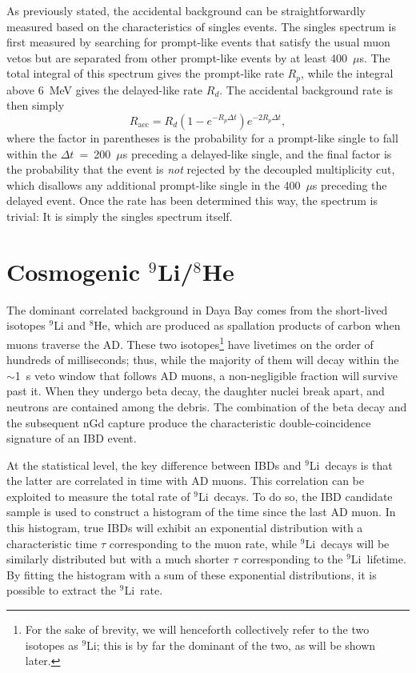 \documentclass[../thesis.tex]{subfiles}
\begin{document}
As previously stated, the accidental background can be straightforwardly measured based on the characteristics of singles events. The singles spectrum is first measured by searching for prompt-like events that satisfy the usual muon vetos but are separated from other prompt-like events by at least 400~$\mu$s. The total integral of this spectrum gives the prompt-like rate $R_p$, while the integral above 6~MeV gives the delayed-like rate $R_d$. The accidental background rate is then simply
\[ R_\mathrm{acc} = R_d(1 - e^{-R_p\Delta t})e^{-2R_p\Delta t}, \] where the factor in parentheses is the probability for a prompt-like single to fall within the $\Delta t$~=~200~$\mu$s preceding a delayed-like single, and the final factor is the probability that the event is \emph{not} rejected by the decoupled multiplicity cut, which disallows any additional prompt-like single in the 400~$\mu$s preceding the delayed event. Once the rate has been determined this way, the spectrum is trivial: It is simply the singles spectrum itself.

\begin{comment}
  Mention IHEP's cross-check, and the additional uncertainty stemming from the difference between it and the nominal result?
\end{comment}

\section{Cosmogenic $^9$Li/$^8$He}
\label{sec:bkgCosmo}

\newcommand\linine{$^9$Li}

The dominant correlated background in Daya Bay comes from the short-lived isotopes $^9$Li and $^8$He, which are produced as spallation products of carbon when muons traverse the AD. These two isotopes\footnote{For the sake of brevity, we will henceforth collectively refer to the two isotopes as \linine; this is by far the dominant of the two, as will be shown later.} have livetimes on the order of hundreds of milliseconds; thus, while the majority of them will decay within the $\sim$1~s veto window that follows AD muons, a non-negligible fraction will survive past it. When they undergo beta decay, the daughter nuclei break apart, and neutrons are contained among the debris. The combination of the beta decay and the subsequent nGd capture produce the characteristic double-coincidence signature of an IBD event.

At the statistical level, the key difference between IBDs and \linine\ decays is that the latter are correlated in time with AD muons. This correlation can be exploited to measure the total rate of \linine\ decays. To do so, the IBD candidate sample is used to construct a histogram of the time since the last AD muon. In this histogram, true IBDs will exhibit an exponential distribution with a characteristic time $\tau$ corresponding to the muon rate, while \linine\ decays will be similarly distributed but with a much shorter $\tau$ corresponding to the \linine\ lifetime. By fitting the histogram with a sum of these exponential distributions, it is possible to extract the \linine\ rate.
\end{document}
